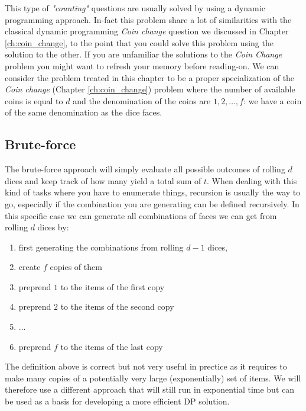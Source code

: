 This type of \textit{"counting"} questions are usually solved by using a dynamic programming approach. 
In-fact this problem share a lot of similarities with the classical dynamic programming \textit{Coin change} question we discussed in Chapter \ref{ch:coin_change},
to the point that you could solve this problem using the solution to the other.
If you are unfamiliar the solutions to the \textit{Coin Change} problem you might want to refresh your memory before reading-on.
We can consider the problem treated in this chapter to be a proper specialization of the \textit{Coin change} (Chapter \ref{ch:coin_change}) 
problem where the number of available coins is equal to $d$ and the denomination of the coins are $1,2,\ldots,f$: we have a coin of the same denomination as the dice faces.


\subsection{Brute-force}
\label{dice_rolls:sec:bruteforce}
The brute-force approach will simply evaluate all possible outcomes of rolling $d$ dices and keep track of how many yield a total sum of $t$.
When dealing with this kind of tasks where you have to enumerate things, recursion is usually the way to go, especially 
if the combination you are generating can be defined recursively.
In this specific case we can generate all combinations of faces we can get from rolling $d$ dices by:
\begin{enumerate}
	\item first generating the combinations from rolling $d-1$ dices,
	\item create $f$ copies of them
	\item preprend $1$ to the items of the first copy
	\item preprend $2$ to the items of the second copy
	\item $\ldots$
	\item preprend $f$ to the items of the last copy
\end{enumerate}
The definition above is correct but not very useful in prectice as it requires to make many copies of a potentially very large (exponentially) set of items. 
We will therefore use a different approach that will still run in exponential time but can be used as a basis for developing a more efficient DP solution.

